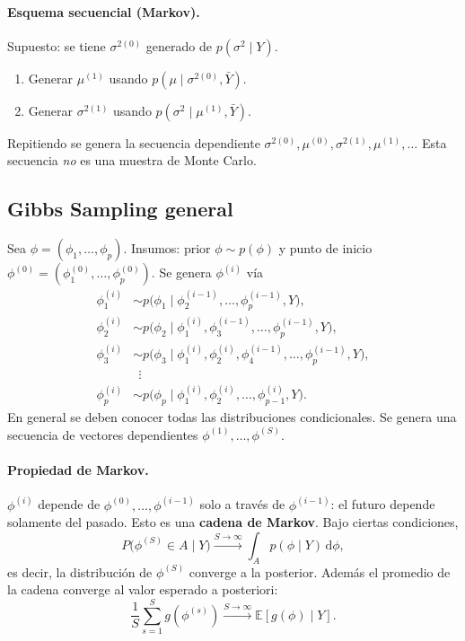 \documentclass[11pt]{article}
\newcommand{\E}{\mathbb{E}}
\newcommand{\dpar}{\mathrm{d}}
\theoremstyle{definition}
\begin{document}
\paragraph{Esquema secuencial (Markov).} Supuesto: se tiene $\sigma^{2(0)}$ generado de $p(\sigma^2\mid Y)$.
\begin{enumerate}[leftmargin=2em]
  \item Generar $\mu^{(1)}$ usando $p(\mu\mid\sigma^{2(0)},\bar Y)$.
  \item Generar $\sigma^{2(1)}$ usando $p(\sigma^2\mid\mu^{(1)},\bar Y)$.
\end{enumerate}
Repitiendo se genera la secuencia dependiente $\sigma^{2(0)},\mu^{(0)},\sigma^{2(1)},\mu^{(1)},\dots$ Esta secuencia \emph{no} es una muestra de Monte Carlo.

\subsection{Gibbs Sampling general}
Sea $\phi=(\phi_1,\dots,\phi_p)$. Insumos: prior $\phi\sim p(\phi)$ y punto de inicio $\phi^{(0)}=(\phi_1^{(0)},\dots,\phi_p^{(0)})$. Se genera $\phi^{(i)}$ vía
\begin{align*}
\phi_1^{(i)}&\sim p\big(\phi_1\mid\phi_2^{(i-1)},\dots,\phi_p^{(i-1)},Y\big),\\
\phi_2^{(i)}&\sim p\big(\phi_2\mid\phi_1^{(i)},\phi_3^{(i-1)},\dots,\phi_p^{(i-1)},Y\big),\\
\phi_3^{(i)}&\sim p\big(\phi_3\mid\phi_1^{(i)},\phi_2^{(i)},\phi_4^{(i-1)},\dots,\phi_p^{(i-1)},Y\big),\\
&\ \ \vdots\\
\phi_p^{(i)}&\sim p\big(\phi_p\mid\phi_1^{(i)},\phi_2^{(i)},\dots,\phi_{p-1}^{(i)},Y\big).
\end{align*}
En general se deben conocer todas las distribuciones condicionales. Se genera una secuencia de vectores dependientes $\phi^{(1)},\dots,\phi^{(S)}$.

\paragraph{Propiedad de Markov.} $\phi^{(i)}$ depende de $\phi^{(0)},\dots,\phi^{(i-1)}$ solo a través de $\phi^{(i-1)}$: el futuro depende solamente del pasado. Esto es una \textbf{cadena de Markov}. Bajo ciertas condiciones,
\[
P\big(\phi^{(S)}\in A\mid Y\big)\xrightarrow{S\to\infty}\int_A p(\phi\mid Y)\,\dpar\phi,
\]
es decir, la distribución de $\phi^{(S)}$ converge a la posterior. Además el promedio de la cadena converge al valor esperado a posteriori:
\[
\frac{1}{S}\sum_{s=1}^S g(\phi^{(s)})\xrightarrow{S\to\infty}\E[g(\phi)\mid Y].
\]
\end{document}
